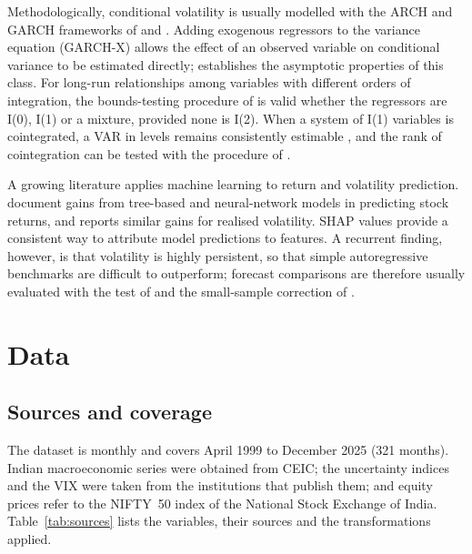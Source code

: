 \documentclass[10pt,twocolumn,a4paper]{article}
\begin{document}
Methodologically, conditional volatility is usually modelled with the ARCH and GARCH frameworks of \citet{engle1982} and \citet{bollerslev1986}. Adding exogenous regressors to the variance equation (GARCH-X) allows the effect of an observed variable on conditional variance to be estimated directly; \citet{han2015} establishes the asymptotic properties of this class. For long-run relationships among variables with different orders of integration, the bounds-testing procedure of \citet{pesaran2001} is valid whether the regressors are I(0), I(1) or a mixture, provided none is I(2). When a system of I(1) variables is cointegrated, a VAR in levels remains consistently estimable \citep{sims1990}, and the rank of cointegration can be tested with the procedure of \citet{johansen1991}.

A growing literature applies machine learning to return and volatility prediction. \citet{gu2020} document gains from tree-based and neural-network models in predicting stock returns, and \citet{bucci2020} reports similar gains for realised volatility. SHAP values \citep{lundberg2017} provide a consistent way to attribute model predictions to features. A recurrent finding, however, is that volatility is highly persistent, so that simple autoregressive benchmarks are difficult to outperform; forecast comparisons are therefore usually evaluated with the test of \citet{diebold1995} and the small-sample correction of \citet{harvey1997}.

\section{Data}\label{sec:data}

\subsection{Sources and coverage}

The dataset is monthly and covers April 1999 to December 2025 (321 months). Indian macroeconomic series were obtained from CEIC; the uncertainty indices and the VIX were taken from the institutions that publish them; and equity prices refer to the NIFTY~50 index of the National Stock Exchange of India. Table~\ref{tab:sources} lists the variables, their sources and the transformations applied.
\end{document}
